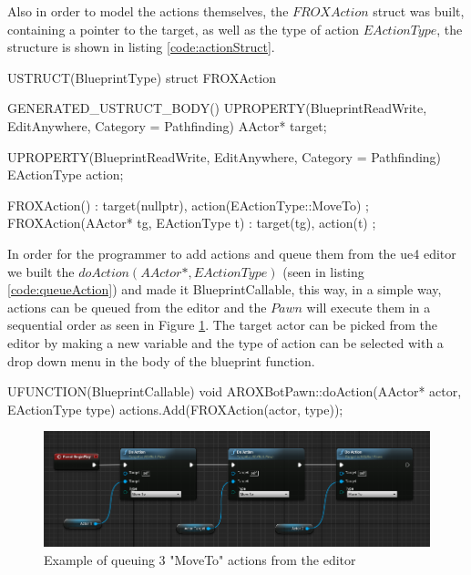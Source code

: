 Also in order to model the actions themselves, the $FROXAction$ struct was built, containing a pointer to the target, as well as the type of action $EActionType$, the structure is shown in listing \ref{code:actionStruct}.

\begin{listing}[language=C++, caption=FROXAction struct, frame=single, label=code:actionStruct]
	USTRUCT(BlueprintType)
	struct FROXAction
	{
		GENERATED_USTRUCT_BODY()
		UPROPERTY(BlueprintReadWrite, EditAnywhere, Category = Pathfinding)
		AActor* target;
		
		UPROPERTY(BlueprintReadWrite, EditAnywhere, Category = Pathfinding)
		EActionType action;
		
		FROXAction() : target(nullptr), action(EActionType::MoveTo) {};
		FROXAction(AActor* tg, EActionType t) : target(tg), action(t) {};
	}
\end{listing}

In order for the programmer to add actions and queue them from the \gls{ue4} editor we built the $doAction(AActor*, EActionType)$ (seen in listing \ref{code:queueAction}) and made it BlueprintCallable, this way, in a simple way, actions can be queued from the editor and the $Pawn$ will execute them in a sequential order as seen in Figure \ref{action_queue}. The target actor can be picked from the editor by making a new variable and the type of action can be selected with a drop down menu in the body of the blueprint function.

\begin{listing}[language=C++, caption=doAction function which queues a new FROXAction to the system, frame=single, label=code:queueAction]
	UFUNCTION(BlueprintCallable)
	void AROXBotPawn::doAction(AActor* actor, EActionType type) 
	{	
		actions.Add(FROXAction(actor, type));
	}
\end{listing}

\begin{figure}[h]
	\includegraphics[scale=0.4]{archivos/action_queue.png}
	\centering
	\caption{Example of queuing 3 "MoveTo" actions from the editor}
	\label{action_queue}
\end{figure}

